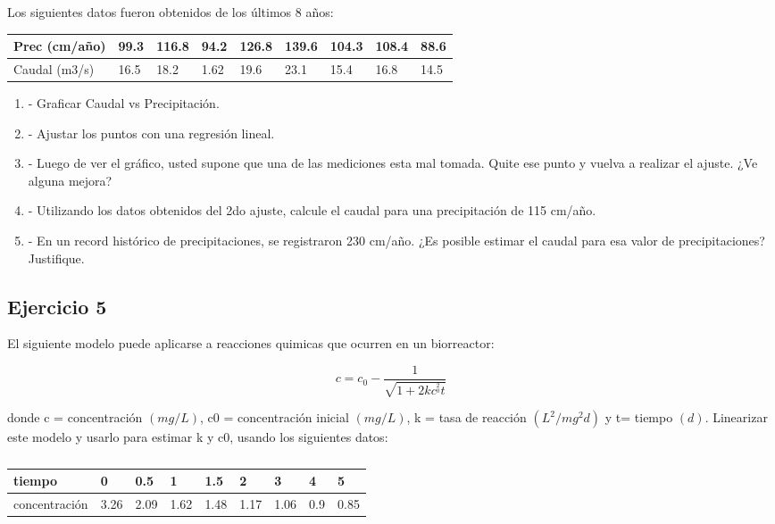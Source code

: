 \documentclass[a4paper,11pt]{article}
\theoremstyle{mytheor}
\begin{document}
Los siguientes datos fueron obtenidos de los últimos 8 años:

\begin{table}[h!]
\centering
\begin{tabular}{l|llllllll}
 \hline
Prec (cm/año) & 99.3 & 116.8 & 94.2 & 126.8 & 139.6 & 104.3 & 108.4 & 88.6    \\ \hline
Caudal (m3/s) & 16.5 & 18.2  & 1.62 & 19.6  & 23.1  & 15.4  & 16.8  & 14.5    \\ \hline
\end{tabular}
\end{table}

\begin{enumerate}[label=\alph*]
    \item- Graficar Caudal vs Precipitación.
    \item- Ajustar los puntos con una regresión lineal.
    \item- Luego de ver el gráfico, usted supone que una de las mediciones esta mal tomada. Quite ese punto y vuelva a realizar el ajuste. ¿Ve alguna mejora?
    \item- Utilizando los datos obtenidos del 2do ajuste, calcule el caudal para una precipitación de 115 cm/año.
    \item- En un record histórico de precipitaciones, se registraron 230 cm/año. ¿Es posible estimar el caudal para esa valor de precipitaciones? Justifique.
\end{enumerate}


\subsection*{Ejercicio 5}

El siguiente modelo puede aplicarse a reacciones quimicas que ocurren en un biorreactor:

\begin{equation*}
    c=c_{0}-\frac{1}{\sqrt{1+2kc^{_{0}^{2}}t}}
\end{equation*}


\noindent donde c = concentración $(mg/L)$, c0 = concentración inicial $(mg/L)$,
k = tasa de reacción $(L^{2}/ mg^{2}d)$ y t= tiempo $(d)$. Linearizar este modelo y usarlo para estimar k y c0, usando los siguientes datos:

\begin{table}[h]
\centering
\begin{tabular}{l|llllllll}
\hline
tiempo & 0    & 0.5  & 1    & 1.5  & 2    & 3    & 4   & 5    \\ \hline
concentración & 3.26 & 2.09 & 1.62 & 1.48 & 1.17 & 1.06 & 0.9 & 0.85 \\ \hline
\end{tabular}
\caption{}
\label{tab:my-table}
\end{table}
\end{document}
